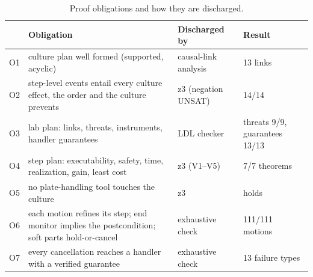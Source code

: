 \documentclass[10pt,a4paper]{article}
\begin{document}
\begin{table}[tbp]\centering\small
\caption{Proof obligations and how they are discharged.}\label{tab:obligations}
\begin{tabularx}{\linewidth}{lXll}\toprule
\textbf{} & \textbf{Obligation} & \textbf{Discharged by} & \textbf{Result} \\\midrule
O1 & culture plan well formed (supported, acyclic) & causal-link analysis & 13 links \\
O2 & step-level events entail every culture effect, the order and the culture prevents & z3 (negation UNSAT) & 14/14 \\
O3 & lab plan: links, threats, instruments, handler guarantees & LDL checker & threats 9/9, guarantees 13/13 \\
O4 & step plan: executability, safety, time, realization, gain, least cost & z3 (V1–V5) & 7/7 theorems \\
O5 & no plate-handling tool touches the culture & z3 & holds \\
O6 & each motion refines its step; end monitor implies the postcondition; soft parts hold-or-cancel & exhaustive check & 111/111 motions \\
O7 & every cancellation reaches a handler with a verified guarantee & exhaustive check & 13 failure types \\\bottomrule
\end{tabularx}
\end{table}
\end{document}
